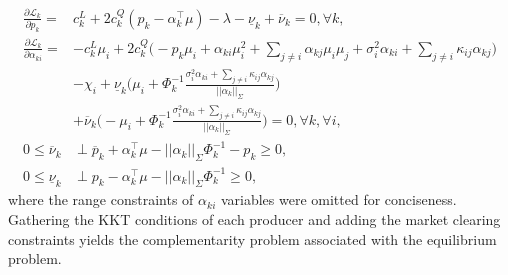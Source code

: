 \documentclass{article}
\begin{document}
\begin{align*}
\frac{\partial \mathcal{L}_k}{\partial p_k} =& c_k^L + 2 c_k^Q (p_k - \alpha_k^\top \mu) - \lambda - \underline{\nu}_k + \overline{\nu}_k = 0, \forall k,\\
\frac{\partial \mathcal{L}_k}{\partial \alpha_{ki}} =& - c_k^L \mu_i + 2 c_k^Q\Big(- p_k \mu_i + \alpha_{ki}\mu_i^2 + \sum_{j \ne i} \alpha_{kj} \mu_i \mu_j + \sigma_i^2 \alpha_{ki} + \sum_{j \ne i} \kappa_{ij} \alpha_{kj}\Big) \\
&- \chi_i + \underline{\nu}_k \Big(\mu_i + \Phi_k^{-1} \frac{\sigma_i^2 \alpha_{ki} + \sum_{j \ne i} \kappa_{ij} \alpha_{kj}}{||\alpha_k||_{\Sigma}}\Big)\\
&+ \overline{\nu}_k \Big(-\mu_i + \Phi_k^{-1} \frac{\sigma_i^2 \alpha_{ki} + \sum_{j \ne i} \kappa_{ij} \alpha_{kj}}{||\alpha_k||_{\Sigma}}\Big) = 0, \forall k, \forall i,\\
0 \le \overline{\nu}_k &\perp \overline{p}_k + \alpha_k^\top \mu - ||\alpha_k||_{\Sigma} \Phi_k^{-1} - p_k \ge 0,\\
0 \le \underline{\nu}_k & \perp p_k - \alpha_k^\top \mu - ||\alpha_k||_{\Sigma}\Phi_k^{-1} \ge 0,
\end{align*}
where the range constraints of $\alpha_{ki}$ variables were omitted for conciseness. Gathering the KKT conditions of each producer and adding the market clearing constraints yields the complementarity problem associated with the equilibrium problem.
\end{document}

